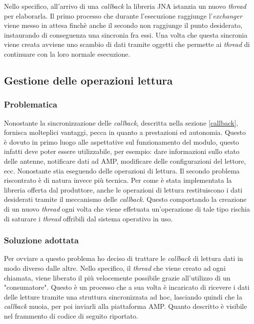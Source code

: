Nello specifico, all'arrivo di una \emph{callback} la libreria JNA istanzia un nuovo \emph{thread} per elaborarla. 
Il primo processo che durante l'esecuzione raggiunge l'\emph{exchanger} viene messo in attesa finchè anche il secondo non
raggiunge il punto desiderato, instaurando di conseguenza una sincronia fra essi. Una volta che questa sincronia viene
creata avviene uno scambio di dati tramite oggetti che permette ai \emph{thread} di continuare con la loro normale
esecuzione.

\subsection{Gestione delle operazioni lettura}
\subsubsection*{Problematica}
Nonostante la sincronizzazione delle \emph{callback}, descritta nella sezione \ref{callback}, fornisca molteplici
vantaggi, pecca in quanto a prestazioni ed autonomia. Questo è dovuto in primo luogo alle aspettative sul funzionamento
del modulo, questo infatti deve poter essere utilizzabile, per esempio: dare informazioni sullo stato delle antenne, notificare
dati ad AMP, modificare delle configurazioni del lettore, ecc. Nonostante stia eseguendo delle operazioni di lettura.
Il secondo problema riscontrato è di natura invece più tecnica. Per come è stata implementata la libreria offerta dal produttore,
anche le operazioni di lettura restituiscono i dati desiderati tramite il meccanismo delle \emph{callback}. Questo comportando
la creazione di un nuovo \emph{thread} ogni volta che viene effetuata un'operazione di tale tipo rischia di saturare 
i \emph{thread} offribili dal sistema operativo in uso.

\subsubsection*{Soluzione adottata}
Per ovviare a questo problema ho deciso di trattare le \emph{callback} di lettura dati in modo diverso dalle altre. 
Nello specifico, il \emph{thread} che viene creato ad ogni chiamata, viene liberato il più velocemente possibile grazie all'utilizzo di un
"consumatore". Questo è un processo che a sua volta è incaricato di ricevere i dati delle letture tramite una struttura sincronizzata ad hoc, 
lasciando quindi che la \emph{callback} muoia, per poi inviarli alla piattaforma AMP. Quanto descritto è visibile nel frammento di codice
di seguito riportato.

